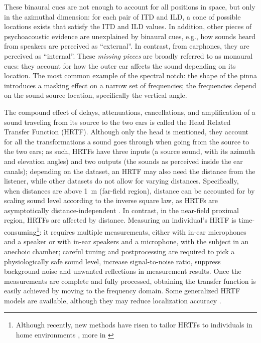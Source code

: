 \documentclass[11pt,a4paper]{article}
\newcommand{\parspace}{\vspace{7pt}}
\begin{document}
\parspace

These binaural cues are not enough to account for all positions in space, but only in the azimuthal dimension: for each pair of ITD and ILD, a cone of possible locations exists that satisfy the ITD and ILD values. In addition, other pieces of psychoacoustic evidence are unexplained by binaural cues, e.g., how sounds heard from speakers are perceived as ``external''. In contrast, from earphones, they are perceived as ``internal''. These \textit{missing pieces} are broadly referred to as monaural cues: they account for how the outer ear affects the sound depending on its location. The most common example of the \hypertarget{text:spectral-notch}{spectral notch}: the shape of the pinna introduces a masking effect on a narrow set of frequencies; the frequencies depend on the sound source location, specifically the vertical angle.

\parspace

The compound effect of delays, attenuations, cancellations, and amplification of a sound traveling from its source to the two ears is called the Head Related Transfer Function (HRTF). Although only the head is mentioned, they account for all the transformations a sound goes through when going from the source to the two ears; as such, HRTFs have three inputs (a source sound, with its azimuth and elevation angles) and two outputs (the sounds as perceived inside the ear canals); depending on the dataset, an HRTF may also need the distance from the listener, while other datasets do not allow for varying distances. Specifically, when distances are above \qty{1}{\meter} (far-field region), distance can be accounted for by scaling sound level according to the inverse square law, as HRTFs are asymptotically distance-independent \cite{brungartAuditoryLocalizationNearby1999}. In contrast, in the near-field proximal region, HRTFs are affected by distance. \label{extra:hrtf_diff} Measuring an individual's HRTF is time-consuming\footnote{Although recently, new methods have risen to tailor HRTFs to individuals in home environments \cite{wolfImplementingContinuousAzimuthBinaural2020}, more in \cite{wolfImplementingContinuousAzimuthBinaural2020}
}: it requires multiple measurements, either with in-ear microphones and a speaker or with in-ear speakers and a microphone, with the subject in an anechoic chamber; careful tuning and postprocessing are required to pick a physiologically safe sound level, increase signal-to-noise ratio, suppress background noise and unwanted reflections in measurement results. Once the measurements are complete and fully processed, obtaining the transfer function is easily achieved by moving to the frequency domain. Some generalized HRTF models are available, although they may reduce localization accuracy \cite{wolfImplementingContinuousAzimuthBinaural2020}.
\end{document}
